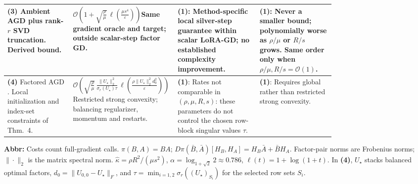 \begin{table}[tp]
\begin{threeparttable}
\begin{tabularx}{\linewidth}{@{}>{\raggedright\arraybackslash}p{0.20\linewidth}>{\raggedright\arraybackslash}p{0.32\linewidth}>{\raggedright\arraybackslash}p{0.25\linewidth}>{\raggedright\arraybackslash}X@{}}
\midrule
\textbf{(3)} Ambient AGD \citep[Thm.~3.18]{qfsBubeck2015} plus rank-$r$ SVD truncation. Derived bound.
& $\mathcal{O}\!\left(1+\sqrt{\frac\rho\mu}\,\ell\!\left(\frac{\mu s^4}{\varepsilon}\right)\right)$\newline Same gradient oracle and target; outside scalar-step factor GD.
& \textbf{(1)}: Method-specific local silver-step guarantee within scalar LoRA-GD; no established complexity improvement.
& \textbf{(1)}: Never a smaller bound; polynomially worse as $\rho/\mu$ or $R/s$ grows. Same order only when $\rho/\mu,R/s=\mathcal{O}(1)$. \\
\midrule
\textbf{(4)} Factored AGD \citep[Thm.~4, \S7]{slLiLin2019v6}. Local initialization and index-set constraints of Thm.~4.
& $\mathcal{O}\!\left(\sqrt{\frac\rho\mu}\,\frac{\|U_\star\|_2^2}{\sigma_r(U_\star)\tau}\,\ell\!\left(\frac{\rho\|U_\star\|_2^2d_0^2}{\varepsilon}\right)\right)$\newline Restricted strong convexity; balancing regularizer, momentum and restarts.
& \textbf{(1)}: Rates not comparable in $(\rho,\mu,R,s)$: these parameters do not control the chosen row-block singular values $\tau$.
& \textbf{(1)}: Requires global rather than restricted strong convexity. \\
\bottomrule
\end{tabularx}
\begin{tablenotes}[flushleft]\footnotesize
\item[] \textbf{Abbr:} Costs count full-gradient calls. $\pi(B,A)=BA$; $D\pi(\bar B,\bar A)[H_B,H_A]=H_B\bar A+\bar B H_A$. Factor-pair norms are Frobenius norms; $\|\cdot\|_2$ is the matrix spectral norm. $\widehat\kappa=\rho R^2/(\mu s^2)$, $\alpha=\log_{1+\sqrt2}2\approx0.786$, $\ell(t)=1+\log(1+t)$. In \textbf{(4)}, $U_\star$ stacks balanced optimal factors, $d_0=\|U_{0,0}-U_\star\|_F$, and $\tau=\min_{i=1,2}\sigma_r((U_\star)_{S_i})$ for the selected row sets $S_i$.
\end{tablenotes}
\end{threeparttable}
\end{table}
\clearpage

